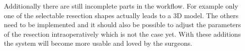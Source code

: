 Additionally there are still incomplete
parts in the workflow. For example only one of the selectable resection shapes
actually leads to a 3D model. The others need to be implemented and it should
also be possible to adjust the parameters of the resection intraoperatively
which is not the case yet. With these additions the system will become more
usable and loved by the surgeons.




